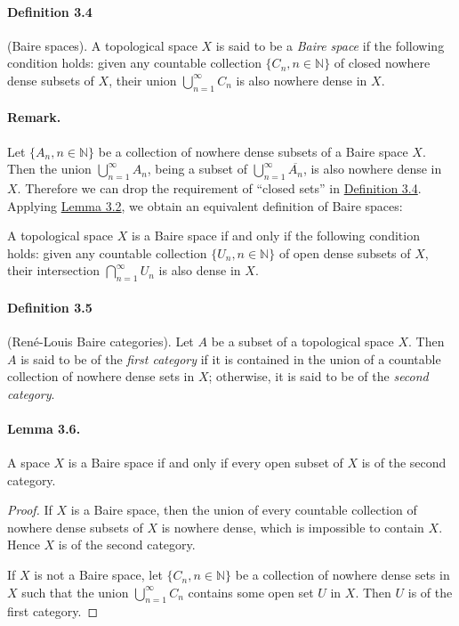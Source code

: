 \documentclass{article}
\begin{document}
\paragraph{Definition 3.4\label{def:3.4}} (Baire spaces). A topological space $X$ is said to be a \textit{Baire space} if the following condition holds: given any countable collection $\{C_n,n\in\mathbb{N}\}$ of closed nowhere dense subsets of $X$, their union $\bigcup_{n=1}^\infty C_n$ is also nowhere dense in $X$.

\paragraph{Remark.} Let $\{A_n,n\in\mathbb{N}\}$ be a collection of nowhere dense subsets of a Baire space $X$. Then the union $\bigcup_{n=1}^\infty A_n$, being a subset of $\bigcup_{n=1}^\infty\overline{A_n}$, is also nowhere dense in $X$. Therefore we can drop the requirement of ``closed sets'' in \hyperref[def:3.4]{Definition 3.4}. Applying \hyperref[lemma:3,2]{Lemma 3.2}, we obtain an equivalent definition of Baire spaces:\vspace{0.1cm}

A topological space $X$ is a Baire space if and only if the following condition holds: given any countable collection $\{U_n,n\in\mathbb{N}\}$ of open dense subsets of $X$, their intersection $\bigcap_{n=1}^\infty U_n$ is also dense in $X$.

\paragraph{Definition 3.5\label{def:3.5}} (René-Louis Baire categories). Let $A$ be a subset of a topological space $X$. Then $A$ is said to be of the \textit{first category} if it is contained in the union of a countable collection of nowhere dense sets in $X$; otherwise, it is said to be of the \textit{second category}.
\paragraph{Lemma 3.6.\label{lemma:3.6}} A space $X$ is a Baire space if and only if every open subset of $X$ is of the second category.
\begin{proof}
If $X$ is a Baire space, then the union of every countable collection of nowhere dense subsets of $X$ is nowhere dense, which is impossible to contain $X$. Hence $X$ is of the second category.

If $X$ is not a Baire space, let $\{C_n,n\in\mathbb{N}\}$ be a collection of nowhere dense sets in $X$ such that the union $\bigcup_{n=1}^\infty C_n$ contains some open set $U$ in $X$. Then $U$ is of the first category.
\end{proof}
\end{document}
